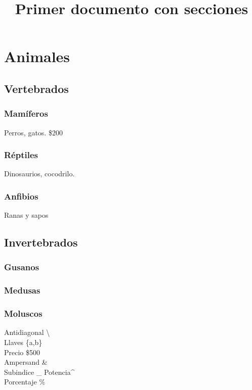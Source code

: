\documentclass{article}
\title{Primer documento con secciones}
\begin{document}
\maketitle
\section{Animales}
    \subsection{Vertebrados}
        \subsubsection{Mamíferos}
        Perros, gatos.
        \$200
        \subsubsection{Réptiles}
        Dinosaurios, cocodrilo.
        \subsubsection{Anfibios}
        Ranas y sapos
    \subsection{Invertebrados}
        \subsubsection{Gusanos}
        \subsubsection{Medusas}
        \subsubsection{Moluscos}
        \lipsum
        
    
    Antidiagonal \textbackslash \\
    Llaves \{a,b\} \\
    Precio \$500 \\
    Ampersand \& \\
    Subindice \_ Potencia\^{} \\
    Porcentaje \%
    
\end{document}
